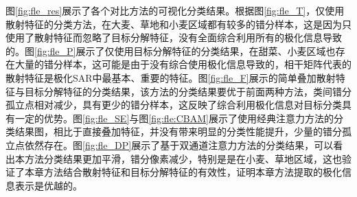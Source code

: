 图\ref{fig:fle_res}展示了各个对比方法的可视化分类结果。根据图\ref{fig:fle_T}，仅使用散射特征的分类方法，在大麦、草地和小麦区域都有较多的错分样本，这是因为只使用了散射特征而忽略了目标分解特征，没有全面综合利用所有的极化信息导致的。图\ref{fig:fle_P}展示了仅使用目标分解特征的分类结果，在甜菜、小麦区域也存在大量的错分样本，这可能是由于没有综合使用极化信息导致的，相干矩阵代表的散射特征是极化SAR中最基本、重要的特征。图\ref{fig:fle_F}展示的简单叠加散射特征与目标分解特征的分类结果，该方法的分类结果要优于前面两种方法，类间错分孤立点相对减少，具有更少的错分样本，这反映了综合利用极化信息对目标分类具有一定的优势。图\ref{fig:fle_SE}与图\ref{fig:fle:CBAM}展示了使用经典注意力方法的分类结果图，相比于直接叠加特征，并没有带来明显的分类性能提升，少量的错分孤立点依然存在。图\ref{fig:fle_DP}展示了基于双通道注意力方法的分类结果，可以看出本方法分类结果更加平滑，错分像素减少，特别是是在小麦、草地区域，这也验证了本章方法结合散射特征和目标分解特征的有效性，证明本章方法提取的极化信息表示是优越的。
